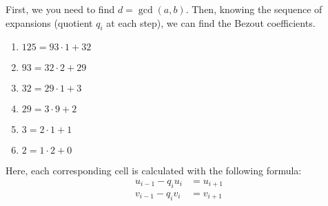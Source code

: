 \documentclass[../lecture-notes-148x210.tex]{subfiles}
\begin{document}
\begin{example} 
    \hfill

    First, we you need to find $d = \gcd(a,b)$. Then, knowing the sequence of
    expansions (quotient $q_i$ at each step), we can find the Bezout
    coefficients. 

    \hfill

    \begin{minipage}{0.35\textwidth}
        \raggedright
        \vspace*{\fill}
            \begin{enumerate}
                \item $125 = 93 \cdot 1 + 32$
                \item $93 = 32 \cdot 2 + 29$
                \item $32 = 29 \cdot 1 + 3$
                \item $29 = 3 \cdot 9 + 2$
                \item $3 = 2 \cdot 1 + 1$
                \item $2 = 1 \cdot 2 + 0$        
            \end{enumerate}
        \vspace*{\fill}
    \end{minipage}
    \begin{minipage}{0.75\textwidth}
    \end{minipage}

    \hfill
    
    Here, each corresponding cell is calculated with the following formula: 
    \begin{align*}
        u_{i-1} - q_i u_i &= u_{i+1} \\
        v_{i-1} - q_i v_i &= v_{i+1} 
    \end{align*}
\end{example}
\end{document}
